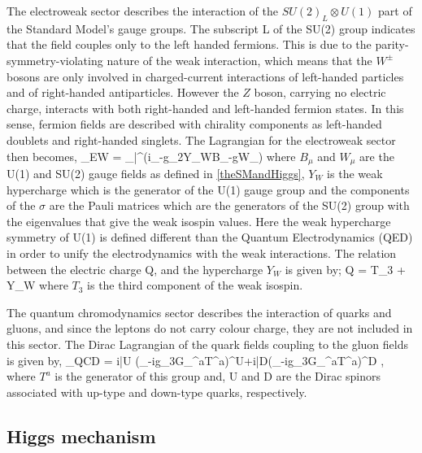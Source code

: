 The electroweak sector describes the interaction of the $SU(2)_L\otimes U(1)$ part of the Standard Model's gauge groups. The subscript L of the SU(2) group indicates that the field couples only to the left handed fermions. This is due to the parity-symmetry-violating nature of the weak interaction, which means that the $W^\pm$ bosons are only involved in charged-current interactions of left-handed particles and of right-handed antiparticles. However the $Z$ boson, carrying no electric charge, interacts with both right-handed and left-handed fermion states. In this sense, fermion fields are described with chirality components as left-handed doublets and right-handed singlets. The Lagrangian for the electroweak sector then becomes,
\be
\Lag_{EW} = \sum_\psi\bar\psi\gamma^\mu\left(i\partial_\mu -g_2Y_WB_\mu-g\sigma W_\mu\right)\psi
\ee
where $B_\mu$ and $W_\mu$ are the U(1) and SU(2) gauge fields as defined in \autoref{theSMandHiggs}, $Y_W$ is the weak hypercharge which is the generator of the U(1) gauge group and the components of the $\sigma$ are the Pauli matrices which are the generators of the SU(2) group with the eigenvalues that give the weak isospin values. Here the weak hypercharge symmetry of U(1) is defined different than the Quantum Electrodynamics (QED) in order to unify the electrodynamics with the weak interactions. The relation between the electric charge Q, and the hypercharge $Y_W$ is given by;
\be
Q = T_3 + Y_W
\ee
where $T_3$ is the third component of the weak isospin.

The quantum chromodynamics sector describes the interaction of quarks and gluons, and since the leptons do not carry colour charge, they are not included in this sector. The Dirac Lagrangian of the quark fields coupling to the gluon fields is given by,
\be
\Lag_{QCD} = i\bar U \left(\partial_\mu-ig_3G_\mu^aT^a\right)\gamma^\mu U+i\bar D\left(\partial_\mu-ig_3G_\mu^aT^a\right)\gamma^\mu D ,
\ee
where $T^a$ is the generator of this group and, U and D are the Dirac spinors associated with up-type and down-type quarks, respectively.

\subsection{Higgs mechanism}\label{higgsmechanismsection}

